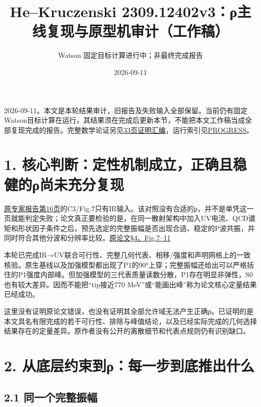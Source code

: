 \documentclass[
  10pt,
  a4paper,
]{article}
\title{He--Kruczenski 2309.12402v3：ρ主线复现与原型机审计（工作稿）}
\subtitle{Watson 固定目标计算进行中；非最终完成报告}
\author{}
\date{2026-09-11}
\begin{document}
\maketitle

{
\setcounter{tocdepth}{2}
\tableofcontents
}
2026-09-11。本文是本轮结果审计，旧报告及失败输入全部保留。当前仍有固定Watson目标计算在运行，其结果须在完成后更新本节，不能把本文工作稿当成全部复现完成的报告。完整数学论证另见\href{../proof_bundle_v2/PROOFS_ZH.pdf}{33页证明汇编}，运行索引见\href{../PROGRESS.json}{PROGRESS}。

\section{1.
核心判断：定性机制成立，正确且稳健的ρ尚未充分复现}\label{ux6838ux5fc3ux5224ux65adux5b9aux6027ux673aux5236ux6210ux7acbux6b63ux786eux4e14ux7a33ux5065ux7684ux3c1ux5c1aux672aux5145ux5206ux590dux73b0}

\href{../../../reports/expert_review_20260910/He_Kruczenski_2309v3_Expert_Review_ZH.pdf}{原专家报告第16页}的C3/Fig.7只有IR输入。该对照没有合适的ρ，并不是单凭这一页就能判定失败；论文真正要检验的是，在同一散射架构中加入UV电流、QCD谱矩和形状因子条件之后，预先选定的完整振幅是否出现合适、稳定的P波共振，并同时符合其他分波和分辨率比较。\href{https://arxiv.org/abs/2309.12402v3}{原论文§4、Fig.7--11}

本轮已完成IR→UV联合可行性、完整几何代表、相移/强度和声明网格上的一致核验。原生基线以及加强模型都出现了P1的90°上穿；完整振幅还给出可以严格括住的P1强度内部峰。但加强模型的三代表质量读数分散，P1存在明显非弹性，S0也有较大差异。因而不能把``tip接近770
MeV''或``能画出峰''称为论文核心定量结果已经成功。

这里没有证明原论文错误，也没有证明其全部允许域无法产生正确ρ。已证明的是本文具名有限完成的若干可行性、排除与峰值结论，以及已经实际完成的几何选择结果存在的定量差异。原作者没有公开的离散细节和代表点规则仍有识别缺口。

\section{2.
从底层约束到ρ：每一步到底推出什么}\label{ux4eceux5e95ux5c42ux7ea6ux675fux5230ux3c1ux6bcfux4e00ux6b65ux5230ux5e95ux63a8ux51faux4ec0ux4e48}

\subsection{2.1
同一个完整振幅}\label{ux540cux4e00ux4e2aux5b8cux6574ux632fux5e45}
\end{document}
